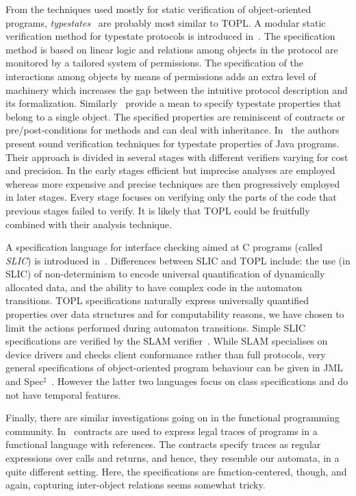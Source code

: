 \documentclass{article} %
\theoremstyle{definition}
\theoremstyle{remark}
\begin{document}
From the techniques used mostly for static verification of object-oriented programs, {\it typestates\/}~\cite{strom1986} are probably most similar to TOPL\null.
A modular static verification method for typestate protocols is introduced in~\cite{dblp:conf/oopsla/bierhoffa07}.
The specification method is based on linear logic and relations among objects in the protocol are monitored by a tailored system of permissions.
The specification of the interactions among objects by means of permissions adds an extra level of machinery which increases the gap between the intuitive protocol description and its formalization.
Similarly~\cite{deline2004,dblp:conf/sigsoft/BierhoffA05} provide a mean to specify typestate properties that belong to a single object.
The specified properties are reminiscent of contracts or pre/post-conditions for methods and can deal with inheritance.
In~\cite{dblp:conf/issta/FinkYDRG06} the authors present sound verification techniques for typestate properties of Java  programs.
Their approach is divided in several stages with different verifiers varying for cost and precision.
In the early stages efficient but imprecise analyses are employed whereas more expensive and precise techniques are then progressively employed in later stages.
Every stage focuses on verifying only the parts of the code that previous stages failed to verify.
It is likely that  TOPL could be fruitfully combined with their analysis technique.

A specification language for interface checking aimed at C programs (called {\it SLIC\/}) is introduced in~\cite{ball2002}.
Differences between SLIC and TOPL include: the use (in SLIC) of non-determinism to encode universal quantification of dynamically allocated data, and the  ability to have complex code in the automaton transitions.
TOPL specifications naturally express universally quantified properties over data structures and for computability reasons,  we have chosen to limit the  actions performed during automaton transitions.
Simple SLIC specifications are verified by  the SLAM verifier~\cite{dblp:conf/cav/ballr01}.
While SLAM specialises on device drivers and checks client conformance rather than full protocols,
very general specifications of object-oriented program behaviour can be given in JML~\cite{jml} and Spec$^\sharp$~\cite{DBLP:journals/jot/BarnettDFLS04}. However the latter two languages focus on class specifications and do not have temporal features.

Finally, there are similar investigations going on in the functional programming community.
In~\cite{disney2011} contracts are used to express legal traces of programs in a functional language with references.
The contracts specify traces as regular expressions over calls and returns, and hence, they resemble our automata, in a quite different setting.
Here, the specifications are function-centered, though, and again, capturing inter-object relations seems somewhat tricky.
\end{document}
